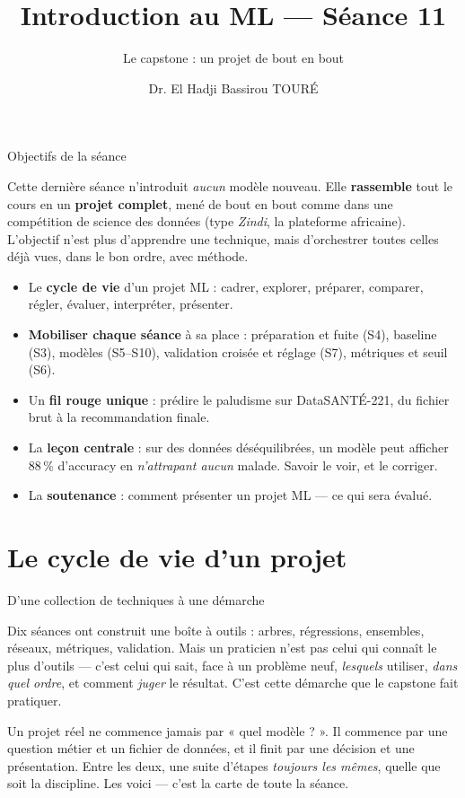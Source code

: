 \documentclass[aspectratio=169,11pt]{beamer}
\title{Introduction au ML — Séance 11}
\subtitle{Le capstone : un projet de bout en bout}
\author{Dr. El Hadji Bassirou TOURÉ}
\institute{Département de Mathématiques et Informatique\\ Faculté des Sciences et Techniques\\ Université Cheikh Anta Diop de Dakar}
\date{}
\begin{document}
\begin{frame}\titlepage\end{frame}

\begin{frame}{Objectifs de la séance}
\begin{ucaddef}
{\small Cette dernière séance n'introduit \emph{aucun} modèle nouveau. Elle \textbf{rassemble} tout le cours en un \textbf{projet complet}, mené de bout en bout comme dans une compétition de science des données (type \emph{Zindi}, la plateforme africaine). L'objectif n'est plus d'apprendre une technique, mais d'orchestrer toutes celles déjà vues, dans le bon ordre, avec méthode.}
\end{ucaddef}
\begin{itemize}\small
  \item Le \textbf{cycle de vie} d'un projet ML : cadrer, explorer, préparer, comparer, régler, évaluer, interpréter, présenter.
  \item \textbf{Mobiliser chaque séance} à sa place : préparation et fuite (S4), baseline (S3), modèles (S5–S10), validation croisée et réglage (S7), métriques et seuil (S6).
  \item Un \textbf{fil rouge unique} : prédire le paludisme sur DataSANTÉ-221, du fichier brut à la recommandation finale.
  \item La \textbf{leçon centrale} : sur des données déséquilibrées, un modèle peut afficher $88\,\%$ d'accuracy en \emph{n'attrapant aucun} malade. Savoir le voir, et le corriger.
  \item La \textbf{soutenance} : comment présenter un projet ML — ce qui sera évalué.
\end{itemize}
\end{frame}

\section{Le cycle de vie d'un projet}

\begin{frame}{D'une collection de techniques à une démarche}
\begin{ucadfront}
{\small Dix séances ont construit une boîte à outils : arbres, régressions, ensembles, réseaux, métriques, validation. Mais un praticien n'est pas celui qui connaît le plus d'outils — c'est celui qui sait, face à un problème neuf, \emph{lesquels} utiliser, \emph{dans quel ordre}, et comment \emph{juger} le résultat. C'est cette démarche que le capstone fait pratiquer.}
\end{ucadfront}
{\small Un projet réel ne commence jamais par « quel modèle ? ». Il commence par une question métier et un fichier de données, et il finit par une décision et une présentation. Entre les deux, une suite d'étapes \emph{toujours les mêmes}, quelle que soit la discipline. Les voici — c'est la carte de toute la séance.}
\end{frame}
\end{document}
